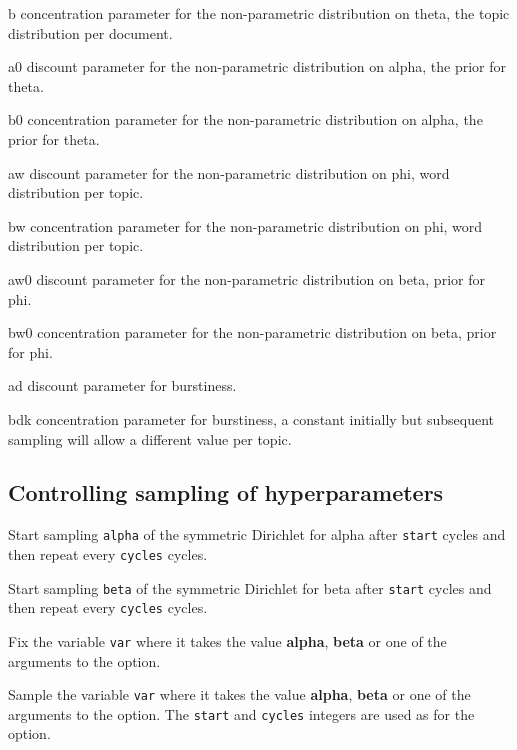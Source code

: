 \documentclass[a4paper,english]{article}
\begin{document}
\begin{Description}
\begin{Description}[bdk]
\item[b] concentration parameter for the non-parametric distribution
  on theta, the topic distribution per document.
\item[a0] discount parameter for the non-parametric distribution
  on alpha, the prior for theta.
\item[b0] concentration parameter for the non-parametric distribution
  on alpha, the prior for theta.
\item[aw] discount parameter for the non-parametric distribution
  on phi, word distribution per topic.
\item[bw] concentration parameter for the non-parametric distribution
  on phi, word distribution per topic.
\item[aw0] discount parameter for the non-parametric distribution
  on beta, prior for phi.
\item[bw0] concentration parameter for the non-parametric distribution
  on beta, prior for phi.
\item[ad] discount parameter for burstiness.
\item[bdk] concentration parameter for burstiness, a constant initially
     but subsequent sampling will allow a different value per topic.
\end{Description}
\end{Description}

\subsection{Controlling sampling of hyperparameters}
\begin{Description}\setlength{\itemsep}{0cm}
\item[\OptArg{-D}{cycles,start}] 
Start sampling \texttt{alpha} of the symmetric Dirichlet for alpha after
\texttt{start} cycles and then repeat every \texttt{cycles} cycles.
\item[\OptArg{-E}{cycles,start}] 
Start sampling \texttt{beta} of the symmetric Dirichlet for beta after
\texttt{start} cycles and then repeat every \texttt{cycles} cycles.
\item[\OptArg{-F}{var}]
Fix the variable \texttt{var} where
it takes the value \textbf{alpha}, \textbf{beta} or one of the
arguments to the  option.
\item[\OptArg{-G}{var,cycles,start}]
Sample the variable \texttt{var} where
it takes the value \textbf{alpha}, \textbf{beta} or one of the
arguments to the  option.
The \texttt{start} and \texttt{cycles} integers are used as for
the  option.
\end{Description}
\end{document}
